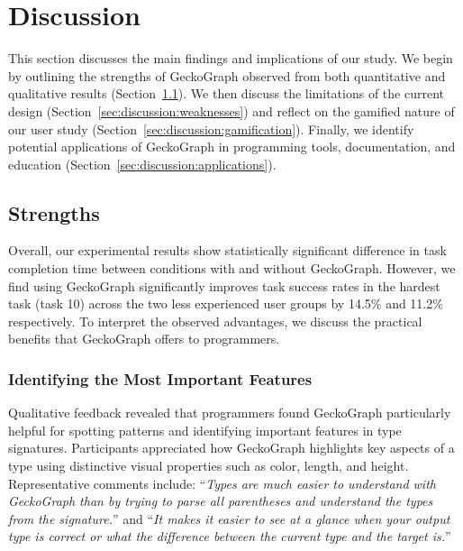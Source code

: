 \documentclass[preprint,12pt]{elsarticle}
\begin{document}
\section{Discussion} \label{sec:discussion}

This section discusses the main findings and implications of our study. 
We begin by outlining the strengths of GeckoGraph observed from both quantitative and qualitative results (Section~\ref{sec:discussion:strengths}). 
We then discuss the limitations of the current design (Section~\ref{sec:discussion:weaknesses}) and reflect on the gamified nature of our user study (Section~\ref{sec:discussion:gamification}). 
Finally, we identify potential applications of GeckoGraph in programming tools, documentation, and education (Section~\ref{sec:discussion:applications}).

\subsection{Strengths}\label{sec:discussion:strengths}
Overall, our experimental results show statistically significant difference in task completion time between conditions with and without GeckoGraph. However, we find using GeckoGraph significantly improves task success rates in the hardest task (task 10) across the two less experienced user groups by 14.5\% and 11.2\% respectively. 
To interpret the observed advantages, we discuss the practical benefits that GeckoGraph offers to programmers.

\subsubsection{Identifying the Most Important Features}
Qualitative feedback revealed that programmers found GeckoGraph particularly helpful for spotting patterns and identifying important features in type signatures. 
Participants appreciated how GeckoGraph highlights key aspects of a type using distinctive visual properties such as color, length, and height. 
Representative comments include: 
``{\it Types are much easier to understand with GeckoGraph than by trying to parse all parentheses and understand the types from the signature.}'' and 
``{\it It makes it easier to see at a glance when your output type is correct or what the difference between the current type and the target is.}''
\end{document}

